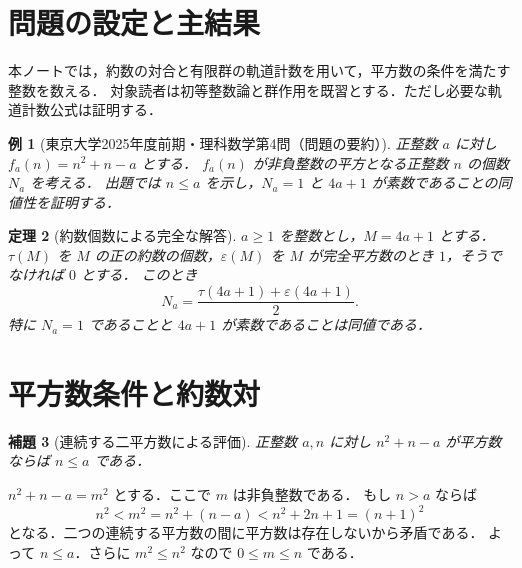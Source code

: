 \documentclass[a5paper,10pt,onecolumn]{jsarticle}
\makeatletter
\theoremstyle{mathnotetheorem}
\newtheorem{theorem}{定理}[section]
\newtheorem{lemma}[theorem]{補題}
\newtheorem{example}[theorem]{例}
\renewcommand{\proofname}{証明}
\renewenvironment{proof}[1][\proofname]{%
  \par\pushQED{\qed}\normalfont\topsep4\p@\@plus2\p@\relax
  \trivlist\item[\hskip\labelsep\bfseries #1]\ignorespaces
}{\popQED\endtrivlist\@endpefalse}
\makeatother
\begin{document}
\section{問題の設定と主結果}
本ノートでは，約数の対合と有限群の軌道計数を用いて，平方数の条件を満たす整数を数える．
対象読者は初等整数論と群作用を既習とする．ただし必要な軌道計数公式は証明する．

\begin{example}[東京大学2025年度前期・理科数学第4問（問題の要約）]\label{ex:todai}
正整数 $a$ に対し $f_a(n)=n^2+n-a$ とする．
$f_a(n)$ が非負整数の平方となる正整数 $n$ の個数 $N_a$ を考える．
出題では $n\le a$ を示し，$N_a=1$ と $4a+1$ が素数であることの同値性を証明する．
\end{example}

\begin{theorem}[約数個数による完全な解答]\label{thm:main}
$a\ge1$ を整数とし，$M=4a+1$ とする．
$\tau(M)$ を $M$ の正の約数の個数，$\varepsilon(M)$ を $M$ が完全平方数のとき $1$，そうでなければ $0$ とする．
このとき
\begin{equation}\label{eq:main}
 N_a=\frac{\tau(4a+1)+\varepsilon(4a+1)}{2}.
\end{equation}
特に $N_a=1$ であることと $4a+1$ が素数であることは同値である．
\end{theorem}

\section{平方数条件と約数対}
\begin{lemma}[連続する二平方数による評価]\label{lem:bound}
正整数 $a,n$ に対し $n^2+n-a$ が平方数ならば $n\le a$ である．
\end{lemma}
\begin{proof}
$n^2+n-a=m^2$ とする．ここで $m$ は非負整数である．
もし $n>a$ ならば
\[
 n^2<m^2=n^2+(n-a)<n^2+2n+1=(n+1)^2
\]
となる．二つの連続する平方数の間に平方数は存在しないから矛盾である．
よって $n\le a$．さらに $m^2\le n^2$ なので $0\le m\le n$ である．
\end{proof}
\end{document}
